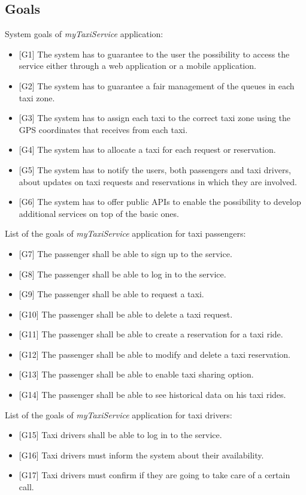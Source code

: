 \documentclass[a4paper,11pt]{report} %
\newcommand{\mts}{\mbox{\normalfont\itshape myTaxiService}}
\begin{document}
	\subsection{Goals} \label{sec:goals}
	System goals of \mts{} application:
	\begin{itemize}
		\item {[}G1{]} The system has to guarantee to the user the possibility to access the service either through a web application or a mobile application.
		\item {[}G2{]} The system has to guarantee a fair management of the queues in each taxi zone.
		\item {[}G3{]} The system has to assign each taxi to the correct taxi zone using the GPS coordinates that receives from each taxi.
		\item {[}G4{]} The system has to allocate a taxi for each request or reservation.
		\item {[}G5{]} The system has to notify the users, both passengers and taxi drivers, about updates on taxi requests and reservations in which they are involved.
		\item {[}G6{]} The system has to offer public APIs to enable the possibility to develop additional services on top of the basic ones.
	\end{itemize}
	List of the goals of \mts{} application for taxi passengers:
		\begin{itemize}
			\item {[}G7{]} The passenger shall be able to sign up to the service.
			\item {[}G8{]} The passenger shall be able to log in to the service.
			\item {[}G9{]} The passenger shall be able to request a taxi.
			\item {[}G10{]} The passenger shall be able to delete a taxi request.
			\item {[}G11{]} The passenger shall be able to create a reservation for a taxi ride.
			\item {[}G12{]} The passenger shall be able to modify and delete a taxi reservation.
			\item {[}G13{]} The passenger shall be able to enable taxi sharing option.
			\item {[}G14{]} The passenger shall be able to see historical data on his taxi rides.
		\end{itemize}
		List of the goals of \mts{} application for taxi drivers:
		\begin{itemize}
			\item {[}G15{]} Taxi drivers shall be able to log in to the service.
			\item {[}G16{]} Taxi drivers must inform the system about their availability.
			\item {[}G17{]} Taxi drivers must confirm if they are going to take care of a certain call.
		\end{itemize}
\end{document}
